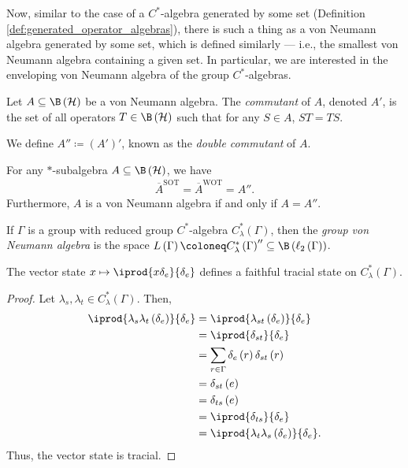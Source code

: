 Now, similar to the case of a $C^{\ast}$-algebra generated by some set (Definition \ref{def:generated_operator_algebras}), there is such a thing as a von Neumann algebra generated by some set, which is defined similarly --- i.e., the smallest von Neumann algebra containing a given set. In particular, we are interested in the enveloping von Neumann algebra of the group $C^{\ast}$-algebras.
\begin{definition}
  Let $A\subseteq \B\left( \mathcal{H} \right)$ be a von Neumann algebra. The \textit{commutant} of $A$, denoted $A'$, is the set of all operators $T\in \B\left( \mathcal{H} \right)$ such that for any $S\in A$, $ST = TS$.\newline

  We define $A'' \coloneq \left( A' \right)'$, known as the \textit{double commutant} of $A$.
\end{definition}
\begin{theorem}
  For any $\ast$-subalgebra $A\subseteq \B\left( \mathcal{H} \right)$, we have
  \begin{align*}
    \overline{A}^{\text{SOT}} = \overline{A}^{\text{WOT}} = A''.
  \end{align*}
  Furthermore, $A$ is a von Neumann algebra if and only if $A = A''$.
\end{theorem}
\begin{definition}
  If $\Gamma$ is a group with reduced group $C^{\ast}$-algebra $C^{\ast}_{\lambda}\left( \Gamma \right)$, then the \textit{group von Neumann algebra} is the space $L\left( \Gamma \right) \coloneq C^{\ast}_{\lambda}\left( \Gamma \right)'' \subseteq \B\left( \ell_2\left( \Gamma \right) \right)$.
\end{definition}
\begin{proposition}
  The vector state $x\mapsto \iprod{x\delta_e}{\delta_e}$ defines a faithful tracial state on $C^{\ast}_{\lambda}\left( \Gamma \right)$.
\end{proposition}
\begin{proof}
  Let $\lambda_s,\lambda_t\in C^{\ast}_{\lambda}\left( \Gamma \right)$. Then,
  \begin{align*}
    \iprod{\lambda_s\lambda_t\left( \delta_e \right)}{\delta_e} &= \iprod{\lambda_{st}\left( \delta_e \right)}{\delta_e}\\
                                                                &= \iprod{\delta_{st}}{\delta_e}\\
                                                                &= \sum_{r\in\Gamma}\delta_e\left( r \right)\delta_{st}\left( r \right)\\
                                                                &= \delta_{st}\left( e \right)\\
                                                                &= \delta_{ts}\left( e \right)\\
                                                                &= \iprod{\delta_{ts}}{\delta_e}\\
                                                                &= \iprod{\lambda_t\lambda_s\left( \delta_e \right)}{\delta_e}.
  \end{align*}
  Thus, the vector state is tracial.
\end{proof}
